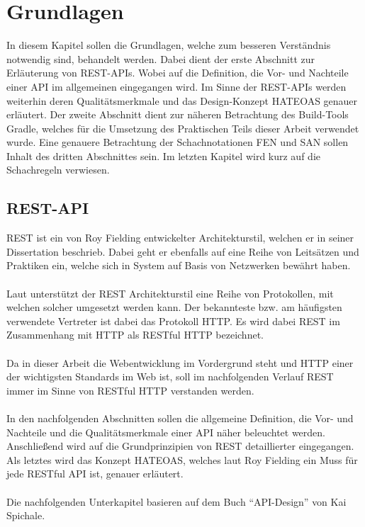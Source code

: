 
\chapter{Grundlagen}
In diesem Kapitel sollen die Grundlagen, welche zum besseren Verständnis notwendig sind, behandelt werden. Dabei dient der erste Abschnitt zur Erläuterung von \gls{REST}-\glspl{API}. Wobei auf die Definition, die Vor- und Nachteile einer \gls{API} im allgemeinen eingegangen wird. Im Sinne der \gls{REST}-\glspl{API} werden weiterhin deren Qualitätsmerkmale und das Design-Konzept HATEOAS genauer erläutert. Der zweite Abschnitt dient zur näheren Betrachtung des Build-Tools Gradle, welches für die Umsetzung des Praktischen Teils dieser Arbeit verwendet wurde. Eine genauere Betrachtung der Schachnotationen \gls{FEN} und \gls{SAN} sollen Inhalt des dritten Abschnittes sein. Im letzten Kapitel wird kurz auf die Schachregeln verwiesen.

\section{REST-API}
\gls{REST} ist ein von Roy Fielding entwickelter Architekturstil, welchen er in seiner Dissertation \cite{dissertationFielding} beschrieb. Dabei geht er ebenfalls auf eine Reihe von Leitsätzen und Praktiken ein, welche sich in System auf Basis von Netzwerken bewährt haben.\\
\\
Laut \cite[143]{apiDesign} unterstützt der REST Architekturstil eine Reihe von Protokollen, mit welchen solcher umgesetzt werden kann. Der bekannteste bzw. am häufigsten verwendete Vertreter ist dabei das Protokoll \gls{HTTP}. Es wird dabei \gls{REST} im Zusammenhang mit \gls{HTTP} als RESTful \gls{HTTP} bezeichnet. \\
\\
Da in dieser Arbeit die Webentwicklung im Vordergrund steht und \gls{HTTP} einer der wichtigsten Standards im Web ist, soll im nachfolgenden Verlauf \gls{REST} immer im Sinne von RESTful \gls{HTTP} verstanden werden.\\
\\
In den nachfolgenden Abschnitten sollen die allgemeine Definition, die Vor- und Nachteile und die Qualitätsmerkmale einer \gls{API} näher beleuchtet werden. Anschließend wird auf die Grundprinzipien von \gls{REST} detaillierter eingegangen. Als letztes wird das Konzept HATEOAS, welches laut Roy Fielding \cite{restMustBeHypertextDriven} ein Muss für jede RESTful \gls{API} ist, genauer erläutert.\\
\\
Die nachfolgenden Unterkapitel basieren auf dem Buch \enquote{API-Design} \cite[7-10, 13-14, 144-148, 189]{apiDesign} von Kai Spichale.

